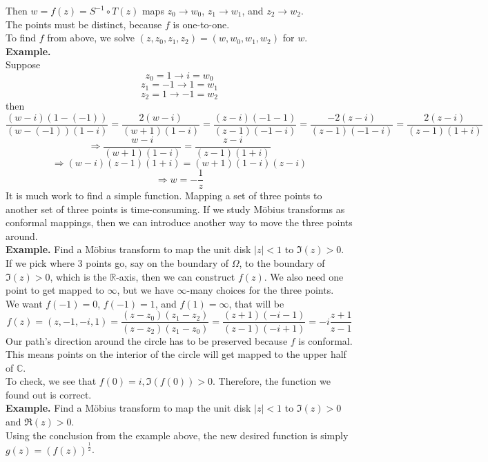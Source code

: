 \documentclass[11pt]{article}
\begin{document}
Then $w = f(z) = S^{-1} \circ T(z)$ maps $z_0 \to w_0$, $z_1 \to w_1$, and $z_2 \to w_2$. \\
The points must be distinct, because $f$ is one-to-one. \\
To find $f$ from above, we solve $(z, z_0, z_1, z_2) = (w, w_0, w_1, w_2)$ for $w$. \\
\newline
\textbf{Example.} \\
Suppose 
$$z_0 = 1 \to i = w_0$$
$$z_1 = -1 \to 1 = w_1$$
$$z_2 = 1 \to -1 = w_2$$
then 
$$\frac{(w - i)(1 - (-1))}{(w - (-1))(1-i)} = \frac{2(w - i)}{(w + 1)(1 - i)} = \frac{(z - i)(-1-1)}{(z - 1)(-1 - i)} = \frac{-2(z - i)}{(z-1)(-1-i)} = \frac{2(z-i)}{(z-1)(1+i)}$$
$$ \Rightarrow \frac{w - i}{(w +1)(1 -i )} = \frac{z - i}{(z - 1)(1 + i)}$$
$$ \Rightarrow (w - i)(z - 1)(1 + i) = (w + 1)(1 - i)(z - i)$$
$$ \Rightarrow w = -\frac{1}{z}$$
It is much work to find a simple function. Mapping a set of three points to another set of three points is time-consuming. If we study Möbius transforms as conformal mappings, then we can introduce another way to move the three points around. \\

\textbf{Example.} Find a Möbius transform to map the unit disk $|z| < 1$ to $\Im(z) > 0$. \\
If we pick where 3 points go, say on the boundary of $\Omega$, to the boundary of $\Im(z) > 0$, which is the $\mathbb{R}$-axis, then we can construct $f(z)$. We also need one point to get mapped to $\infty$, but we have $\infty$-many choices for the three points. \\
We want $f(-1) = 0$, $f(-1) = 1$, and $f(1) = \infty$, that will be 
$$f(z) = (z, -1, -i, 1) = \frac{(z - z_0)(z_1 - z_2)}{(z - z_2)(z_1 - z_0)} = \frac{(z + 1)(-i - 1)}{(z - 1)(-i + 1)} = -i\frac{z + 1}{z - 1}$$
Our path's direction around the circle has to be preserved because $f$ is conformal. \\
This means points on the interior of the circle will get mapped to the upper half of $\mathbb{C}$. \\
To check, we see that $f(0) = i, \Im(f(0)) > 0$. Therefore, the function we found out is correct. \\

\textbf{Example.} Find a Möbius transform to map the unit disk $|z| < 1$ to $\Im(z) > 0$ and $\Re(z) > 0$. \\
Using the conclusion from the example above, the new desired function is simply 
$g(z) = (f(z))^{\frac{1}{2}}$.
\end{document}
